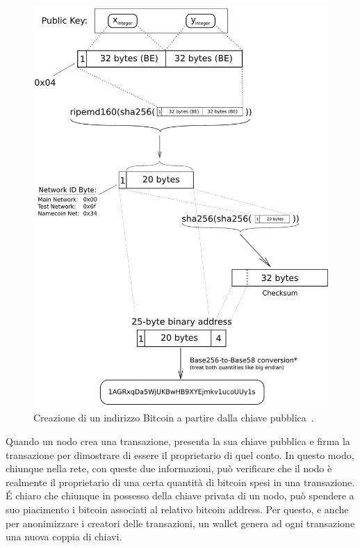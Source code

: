 \begin{figure}[]
	\centering
	\includegraphics[]{img/capuno/PubKeyToAddr.png}
	\caption{Creazione di un indirizzo Bitcoin a partire dalla chiave pubblica~\emph{\cite{bitaddress2020}}.}
	\label{fig:bit_address}
\end{figure}

Quando un nodo crea una transazione, presenta la sua chiave pubblica e firma la transazione per dimostrare di essere il proprietario di quel conto. In questo modo, chiunque nella rete, con queste due informazioni, può verificare che il nodo è realmente il proprietario di una certa quantità di bitcoin spesi in una transazione. \'E chiaro che chiunque in possesso della chiave privata di un nodo, può spendere a suo piacimento i bitcoin associati al relativo bitcoin address. Per questo, e anche per anonimizzare i creatori delle transazioni, un wallet genera ad ogni transazione una nuova coppia di chiavi.

